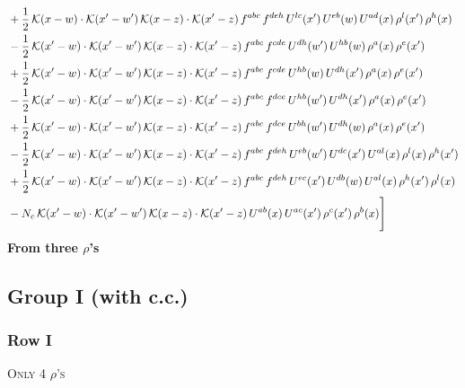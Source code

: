\documentclass[9pt]{article}
\numberwithin{equation}{section}
\begin{document}
\begin{align}
& +\frac{1}{2}\,\mathcal{K}(x-w)\cdot\mathcal{K}(x'-w')\,\mathcal{K}(x-z)\cdot\mathcal{K}(x'-z)\,f^{abc}\,f^{deh}\,U^{lc}(x')\,U^{eb}(w)\,U^{ad}(x)\,\rho^{l}(x')\,\rho^{h}(x)\notag\\
& -\frac{1}{2}\,\mathcal{K}(x'-w)\cdot\mathcal{K}(x'-w')\,\mathcal{K}(x-z)\cdot\mathcal{K}(x'-z)\,f^{abc}\,f^{cde}\,U^{dh}(w')\,U^{hb}(w)\,\rho^{a}(x)\,\rho^{e}(x')\notag\\
& +\frac{1}{2}\,\mathcal{K}(x'-w)\cdot\mathcal{K}(x'-w')\,\mathcal{K}(x-z)\cdot\mathcal{K}(x'-z)\,f^{abc}\,f^{cde}\,U^{hb}(w)\,U^{dh}(x')\,\rho^{a}(x)\,\rho^{e}(x')\notag\\
& -\frac{1}{2}\,\mathcal{K}(x'-w)\cdot\mathcal{K}(x'-w')\,\mathcal{K}(x-z)\cdot\mathcal{K}(x'-z)\,f^{abc}\,f^{dce}\,U^{hb}(w')\,U^{dh}(x')\,\rho^{a}(x)\,\rho^{e}(x')\notag\\
& +\frac{1}{2}\,\mathcal{K}(x'-w)\cdot\mathcal{K}(x'-w')\,\mathcal{K}(x-z)\cdot\mathcal{K}(x'-z)\,f^{abc}\,f^{dce}\,U^{bh}(w')\,U^{dh}(w)\,\rho^{a}(x)\,\rho^{e}(x')\notag\\
& -\frac{1}{2}\,\mathcal{K}(x'-w)\cdot\mathcal{K}(x'-w')\,\mathcal{K}(x-z)\cdot\mathcal{K}(x'-z)\,f^{abc}\,f^{deh}\,U^{eb}(w')\,U^{dc}(x')\,U^{al}(x)\,\rho^{l}(x)\,\rho^{h}(x')\notag\\
& +\frac{1}{2}\,\mathcal{K}(x'-w)\cdot\mathcal{K}(x'-w')\,\mathcal{K}(x-z)\cdot\mathcal{K}(x'-z)\,f^{abc}\,f^{deh}\,U^{ec}(x')\,U^{db}(w)\,U^{al}(x)\,\rho^{h}(x')\,\rho^{l}(x)\notag\\
& -N_{c}\,\mathcal{K}(x'-w)\cdot\mathcal{K}(x'-w')\,\mathcal{K}(x-z)\cdot\mathcal{K}(x'-z)\,U^{ab}(x)\,U^{ac}(x')\,\rho^{c}(x')\,\rho^{b}(x)\Bigg]
\end{align}
\textbf{From three $\rho$'s}
\subsection{Group I (with c.c.)}
\subsubsection{Row I}
\textsc{Only 4 $\rho$'s}
\end{document}
